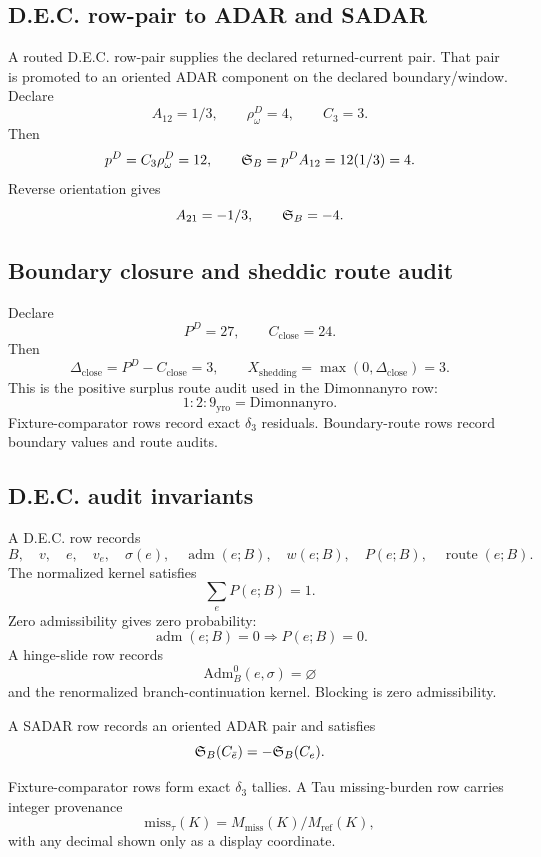 \subsection{D.E.C. row-pair to ADAR and SADAR}\label{manual:dec-ledger:adar-sadar}
A routed D.E.C. row-pair supplies the declared returned-current pair. That pair is promoted to an oriented ADAR component on the declared boundary/window. Declare
\[
A_{12}=1/3,
\qquad
\rho^D_\omega=4,
\qquad
C_3=3.
\]
Then
\[
p^D=C_3\rho^D_\omega=12,
\qquad
\mathfrak S_B=p^D A_{12}=12(1/3)=4.
\]
Reverse orientation gives
\[
A_{21}=-1/3,
\qquad
\mathfrak S_B=-4.
\]

\subsection{Boundary closure and sheddic route audit}\label{manual:dec-ledger:boundary-audit}
Declare
\[
P^D=27,
\qquad
C_{\mathrm{close}}=24.
\]
Then
\[
\Delta_{\mathrm{close}}=P^D-C_{\mathrm{close}}=3,
\qquad
X_{\mathrm{shedding}}=\max(0,\Delta_{\mathrm{close}})=3.
\]
This is the positive surplus route audit used in the Dimonnanyro row:
\[
1{:}2{:}9_{\mathrm{yro}}=\mathrm{Dimonnanyro}.
\]
Fixture-comparator rows record exact \(\delta_3\) residuals. Boundary-route rows record boundary values and route audits.


\subsection{D.E.C. audit invariants}\label{manual:dec-ledger:audit-hooks}
A D.E.C. row records
\[
B,
\quad
v,
\quad
e,
\quad
v_e,
\quad
\sigma(e),
\quad
\operatorname{adm}(e;B),
\quad
w(e;B),
\quad
P(e;B),
\quad
\operatorname{route}(e;B).
\]
The normalized kernel satisfies
\[
\sum_e P(e;B)=1.
\]
Zero admissibility gives zero probability:
\[
\operatorname{adm}(e;B)=0\Rightarrow P(e;B)=0.
\]
A hinge-slide row records
\[
\mathrm{Adm}^0_B(e,\sigma)=\varnothing
\]
and the renormalized branch-continuation kernel. Blocking is zero admissibility.

A SADAR row records an oriented ADAR pair and satisfies
\[
\mathfrak S_B(C_{\bar e})=-\mathfrak S_B(C_e).
\]

Fixture-comparator rows form exact \(\delta_3\) tallies. A Tau missing-burden row carries integer provenance
\[
\mathrm{miss}_\tau(K)=M_{\mathrm{miss}}(K)/M_{\mathrm{ref}}(K),
\]
with any decimal shown only as a display coordinate.

